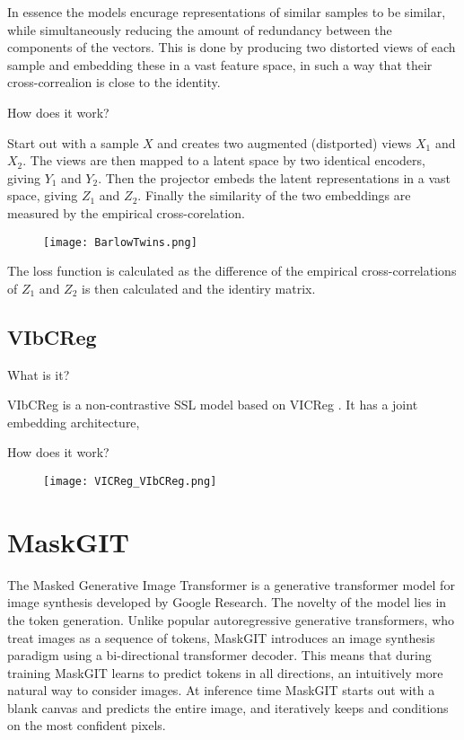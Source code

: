 \documentclass[../../thesis.tex]{subfiles}
\begin{document}
In essence the models encurage representations of similar samples to be similar, while simultaneously reducing the amount of redundancy between the components of the vectors. This is done by producing two distorted views of each sample and embedding these in a vast feature space, in such a way that their cross-correalion is close to the identity. 

How does it work?

Start out with a sample $X$ and creates two augmented (distported) views $X_1$ and $X_2$. The views are then mapped to a latent space by two identical encoders, giving $Y_1$ and $Y_2$. Then the projector embeds the latent representations in a vast space, giving $Z_1$ and $Z_2$. Finally the similarity of the two embeddings are measured by the empirical cross-corelation.

\begin{figure}[h]
    \texttt{[image: BarlowTwins.png]}
    \centering    
    \caption{\cite{zbontar2021barlow}}
\end{figure}

The loss function is calculated as the difference of the empirical cross-correlations of $Z_1$ and $Z_2$ is then calculated and the identiry matrix. 


\subsection{VIbCReg}
What is it?

VIbCReg \cite{lee2024vibcreg} is a non-contrastive SSL model based on VICReg \cite{bardes2022vicreg}. It has a joint embedding architecture,

How does it work?


\begin{figure}[h]
    \texttt{[image: VICReg\_VIbCReg.png]}
    \centering    
    \caption{\cite{lee2024vibcreg}}
\end{figure}


\section{MaskGIT}

The Masked Generative Image Transformer is a generative transformer model for image synthesis developed by Google Research. The novelty of the model lies in the token generation. Unlike popular autoregressive generative transformers, who treat images as a sequence of tokens, MaskGIT introduces an image synthesis paradigm using a bi-directional transformer decoder. This means that during training MaskGIT learns to predict tokens in all directions, an intuitively more natural way to consider images. At inference time MaskGIT starts out with a blank canvas and predicts the entire image, and iteratively keeps and conditions on the most confident pixels.\\\\
\end{document}

